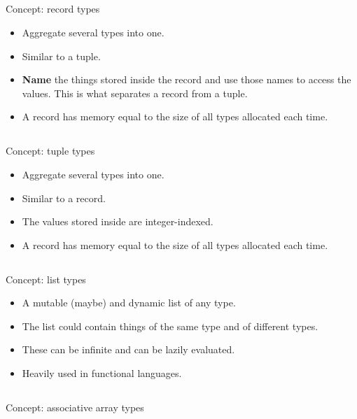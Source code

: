 \subsection{}
Concept: record types

\begin{itemize}[noitemsep]
\item Aggregate several types into one.
\item Similar to a tuple.
\item \textbf{Name} the things stored inside the record and use those names to access the values. This is what separates a record from a tuple.
\item A record has memory equal to the size of all types allocated each time.
\end{itemize}

\subsection{}
Concept: tuple types

\begin{itemize}[noitemsep]
\item Aggregate several types into one.
\item Similar to a record.
\item The values stored inside are integer-indexed.
\item A record has memory equal to the size of all types allocated each time.
\end{itemize}

\subsection{}
Concept: list types

\begin{itemize}[noitemsep]
\item A mutable (maybe) and dynamic list of any type.
\item The list could contain things of the same type and of different types.
\item These can be infinite and can be lazily evaluated.
\item Heavily used in functional languages.
\end{itemize}

\subsection{}
Concept: associative array types

